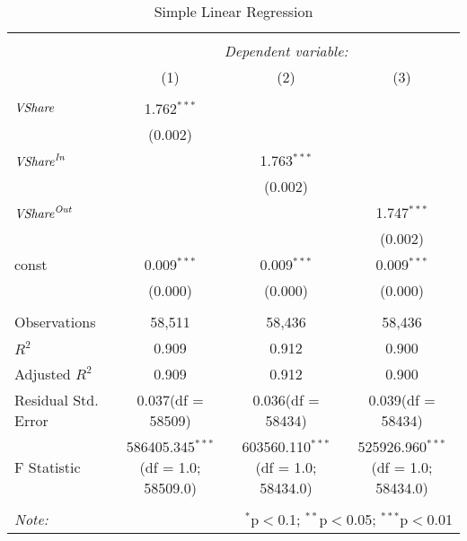 \begin{table}[!htbp] \centering
  \caption{Simple Linear Regression}
\begin{tabular}{@{\extracolsep{5pt}}lccc}
\\[-1.8ex]\hline
\hline \\[-1.8ex]
& \multicolumn{3}{c}{\textit{Dependent variable:}} \
\cr \cline{3-4}
\\[-1.8ex] & (1) & (2) & (3) \\
\hline \\[-1.8ex]
 ${\it VShare}$ & 1.762$^{***}$ & & \\
  & (0.002) & & \\
 ${\it VShare}^{\it In}$ & & 1.763$^{***}$ & \\
  & & (0.002) & \\
 ${\it VShare}^{\it Out}$ & & & 1.747$^{***}$ \\
  & & & (0.002) \\
 const & 0.009$^{***}$ & 0.009$^{***}$ & 0.009$^{***}$ \\
  & (0.000) & (0.000) & (0.000) \\
\hline \\[-1.8ex]
 Observations & 58,511 & 58,436 & 58,436 \\
 $R^2$ & 0.909 & 0.912 & 0.900 \\
 Adjusted $R^2$ & 0.909 & 0.912 & 0.900 \\
 Residual Std. Error & 0.037(df = 58509) & 0.036(df = 58434) & 0.039(df = 58434)  \\
 F Statistic & 586405.345$^{***}$ (df = 1.0; 58509.0) & 603560.110$^{***}$ (df = 1.0; 58434.0) & 525926.960$^{***}$ (df = 1.0; 58434.0) \\
\hline
\hline \\[-1.8ex]
\textit{Note:} & \multicolumn{3}{r}{$^{*}$p$<$0.1; $^{**}$p$<$0.05; $^{***}$p$<$0.01} \\
\end{tabular}
\end{table}
